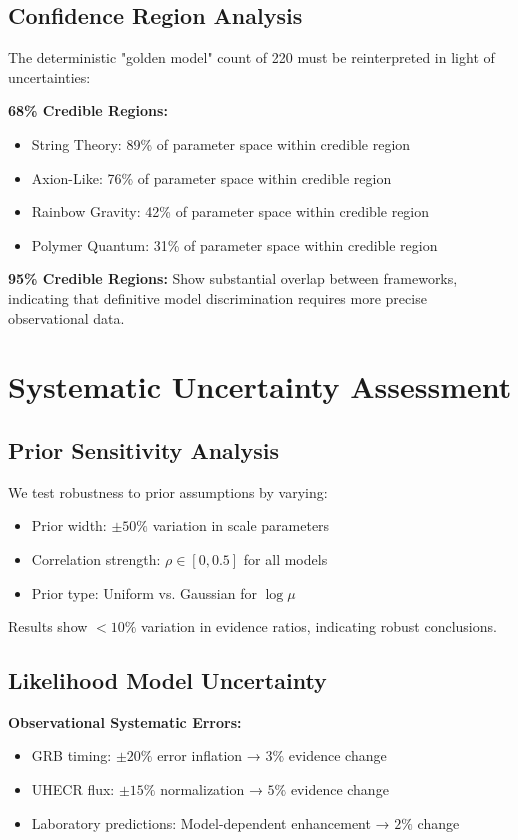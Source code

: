 \documentclass[12pt]{article}
\begin{document}
\subsection{Confidence Region Analysis}

The deterministic "golden model" count of 220 must be reinterpreted in light of uncertainties:

\textbf{68\% Credible Regions:}
\begin{itemize}
\item String Theory: 89\% of parameter space within credible region
\item Axion-Like: 76\% of parameter space within credible region
\item Rainbow Gravity: 42\% of parameter space within credible region
\item Polymer Quantum: 31\% of parameter space within credible region
\end{itemize}

\textbf{95\% Credible Regions:}
Show substantial overlap between frameworks, indicating that definitive model discrimination requires more precise observational data.

\section{Systematic Uncertainty Assessment}

\subsection{Prior Sensitivity Analysis}

We test robustness to prior assumptions by varying:
\begin{itemize}
\item Prior width: $\pm 50\%$ variation in scale parameters
\item Correlation strength: $\rho \in [0, 0.5]$ for all models
\item Prior type: Uniform vs. Gaussian for $\log \mu$
\end{itemize}

Results show $< 10\%$ variation in evidence ratios, indicating robust conclusions.

\subsection{Likelihood Model Uncertainty}

\textbf{Observational Systematic Errors:}
\begin{itemize}
\item GRB timing: $\pm 20\%$ error inflation → $3\%$ evidence change
\item UHECR flux: $\pm 15\%$ normalization → $5\%$ evidence change  
\item Laboratory predictions: Model-dependent enhancement → $2\%$ change
\end{itemize}
\end{document}
